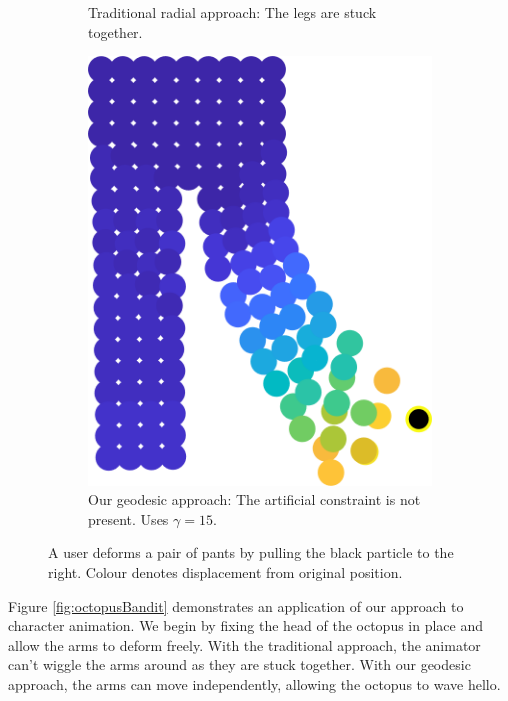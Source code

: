 \documentclass[11pt,a4paper, final, twoside]{article}
\theoremstyle{proposition}
\theoremstyle{definition}
\theoremstyle{remark}
\numberwithin{equation}{section}
\begin{document}
\begin{figure}[h]
\begin{subfigure}[t]{.5\textwidth}
  \caption{Traditional radial approach: The legs are stuck together.}
\end{subfigure}%
\begin{subfigure}[t]{.5\textwidth}
  \centering
  \includegraphics{pantsKickColor.png}
  \caption{Our geodesic approach: The artificial constraint is not present. Uses $\gamma = 15$.}
\end{subfigure}
\caption{A user deforms a pair of pants by pulling the black particle to the right. Colour denotes displacement from original position.}
\label{fig:pantsKick}
\end{figure}

Figure \ref{fig:octopusBandit} demonstrates an application of our approach to character animation. We begin by fixing the head of the octopus in place and allow the arms to deform freely. With the traditional approach, the animator can't wiggle the arms around as they are stuck together. With our geodesic approach, the arms can move independently, allowing the octopus to wave hello.
\end{document}
